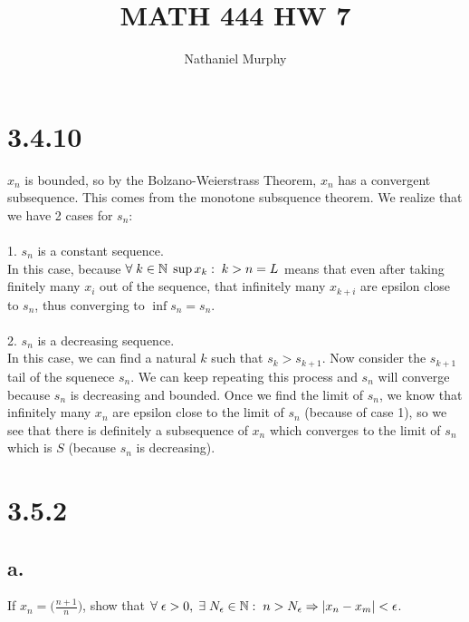 \documentclass[11pt]{article}
\title{\textbf{MATH 444 HW 7}}
\author{Nathaniel Murphy}
\date{}
\begin{document}
\maketitle

\section*{3.4.10}
$x_n$ is bounded, so by the Bolzano-Weierstrass Theorem, $x_n$ has a convergent subsequence. This comes from the monotone subsquence theorem. We realize that we have 2 cases for $s_n$: \\
\\
1. $s_n$ is a constant sequence. \\
In this case, because $\forall \hspace{1mm}k \in \mathbb{N}\hspace{1mm} \sup{x_k:\hspace{1mm}k>n}=L$ means that even after taking finitely many $x_i$ out of the sequence, that infinitely many $x_{k+i}$ are epsilon close to $s_n$, thus converging to $\inf{s_n}=s_n$. \\
\\
2. $s_n$ is a decreasing sequence. \\
In this case, we can find a natural $k$ such that $s_k>s_{k+1}$. Now consider the $s_{k+1}$ tail of the squenece $s_n$. We can keep repeating this process and $s_n$ will converge because $s_n$ is decreasing and bounded. Once we find the limit of $s_n$, we know that infinitely many $x_n$ are epsilon close to the limit of $s_n$ (because of case 1), so we see that there is definitely a subsequence of $x_n$ which converges to the limit of $s_n$ which is $S$ (because $s_n$ is decreasing).

\section*{3.5.2}
\subsection*{a.}
If $x_n=\big(\frac{n+1}{n}\big)$, show that $\forall \hspace{1mm} \epsilon > 0, \hspace{1mm} \exists \hspace{1mm} N_{\epsilon}\in\mathbb{N}:\hspace{1mm}n>N_{\epsilon} \Rightarrow|x_n-x_m|<\epsilon$.
\end{document}
